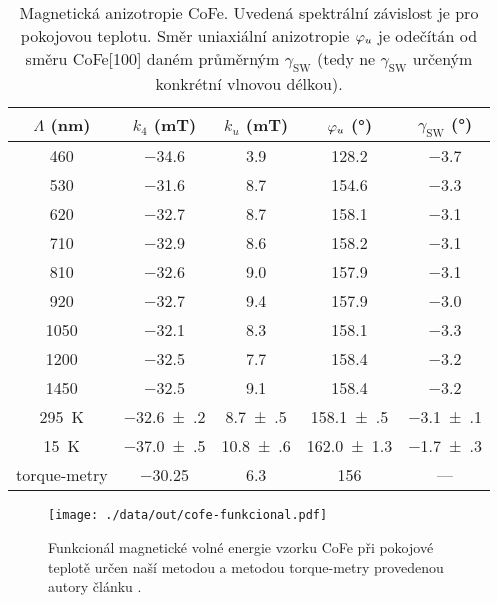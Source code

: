 \begin{table}[tp]
    \centering
    \begin{tabular}{ccccc}
        \toprule
        $\Lambda$ (\si{\nano\meter}) & $k_4$ (\si{\milli\tesla}) & $k_u$ (\si{\milli\tesla}) & $\varphi_u$ (\si{\degree}) & $\gamma_\textrm{SW}$ (\si{\degree}) \\ \midrule[\heavyrulewidth]
        \num{460} & \num{-34.6} & \num{3.9} & \num{128.2} & \num{-3.7} \\
\num{530} & \num{-31.6} & \num{8.7} & \num{154.6} & \num{-3.3} \\
\num{620} & \num{-32.7} & \num{8.7} & \num{158.1} & \num{-3.1} \\
\num{710} & \num{-32.9} & \num{8.6} & \num{158.2} & \num{-3.1} \\
\num{810} & \num{-32.6} & \num{9.0} & \num{157.9} & \num{-3.1} \\
\num{920} & \num{-32.7} & \num{9.4} & \num{157.9} & \num{-3.0} \\
\num{1050} & \num{-32.1} & \num{8.3} & \num{158.1} & \num{-3.3} \\
\num{1200} & \num{-32.5} & \num{7.7} & \num{158.4} & \num{-3.2} \\
\num{1450} & \num{-32.5} & \num{9.1} & \num{158.4} & \num{-3.2} \\ \midrule[\heavyrulewidth]
        \SI{295}{\kelvin} & \num{-32.6(2)} & \num{8.7(5)} & \num{158.1(5)} & \num{-3.1(1)} \\
        \SI{15}{\kelvin} & \num{-37.0(5)} & \num{10.8(6)} & \num{162.0(13)} & \num{-1.7(3)} \\
        torque-metry & \num{-30.25} & \num{6.3} & \num{156} & --- \\
        \bottomrule 
    \end{tabular} 
    \caption{Magnetická anizotropie CoFe. Uvedená spektrální závislost je pro pokojovou teplotu. Směr uniaxiální anizotropie $\varphi_u$ je odečítán od směru CoFe[100] daném průměrným $\gamma_\textrm{SW}$ (tedy ne $\gamma_\textrm{SW}$ určeným konkrétní vlnovou délkou).}
    \label{tab:cofe-anizotropie}
\end{table}

\begin{figure}[htbp]
    \centering
    \texttt{[image: ./data/out/cofe-funkcional.pdf]}
    \caption{Funkcionál magnetické volné energie vzorku CoFe při pokojové teplotě určen naší metodou a metodou torque-metry provedenou autory článku \cite{zengIntrinsicMechanismAnisotropic2020}.}
    \label{fig:cofe-funkcional}
\end{figure}


